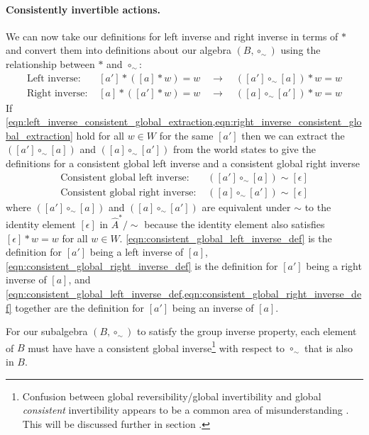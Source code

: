 \paragraph{Consistently invertible actions.}
We can now take our definitions for left inverse and right inverse in terms of $\ast$ and convert them into definitions about our algebra $(B, \circ_{\sim})$ using the relationship between $\ast$ and $\circ_{\sim}$:
\begin{align}
    \text{Left inverse: } & [a'] * ([a] * w) = w \quad \to \quad ([a'] \circ_{\sim} [a]) \ast w = w
    \label{eqn:left_inverse_consistent_global_extraction} \\
    \text{Right inverse: } & [a] * ([a'] * w) = w \quad \to \quad ([a] \circ_{\sim} [a']) \ast w = w
    \label{eqn:right_inverse_consistent_global_extraction}
\end{align}
If \cref{eqn:left_inverse_consistent_global_extraction,eqn:right_inverse_consistent_global_extraction} hold for all $w \in W$ for the same $[a']$ then we can extract the $([a'] \circ_{\sim} [a])$ and $([a] \circ_{\sim} [a'])$ from the world states to give the definitions for a consistent global left inverse and a consistent global right inverse
\begin{align}
    \text{Consistent global left inverse: } & ([a'] \circ_{\sim} [a]) \sim [\epsilon] 
    \label{eqn:consistent_global_left_inverse_def} \\
    \text{Consistent global right inverse: } & ([a] \circ_{\sim} [a']) \sim [\epsilon]
    \label{eqn:consistent_global_right_inverse_def}
\end{align}
where $([a'] \circ_{\sim} [a])$ and $([a] \circ_{\sim} [a'])$ are equivalent under $\sim$ to the identity element $[\epsilon]$ in $\hat{A}^{*}/\sim$ because the identity element also satisfies $[\epsilon] \ast w = w$ for all $w \in W$.
\cref{eqn:consistent_global_left_inverse_def} is the definition for $[a']$ being a left inverse of $[a]$, \cref{eqn:consistent_global_right_inverse_def} is the definition for $[a']$ being a right inverse of $[a]$, and \cref{eqn:consistent_global_left_inverse_def,eqn:consistent_global_right_inverse_def} together are the definition for $[a']$ being an inverse of $[a]$.

For our subalgebra $(B, \circ_{\sim})$ to satisfy the group inverse property, each element of $B$ must have have a consistent global inverse\footnote{
Confusion between global reversibility/global invertibility and global \emph{consistent} invertibility appears to be a common area of misunderstanding .
This will be discussed further in section .
} with respect to $\circ_{\sim}$ that is also in $B$.

